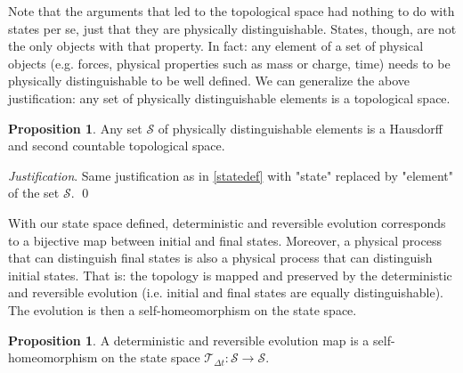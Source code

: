 \documentclass[aps,pra,10pt,twocolumn,floatfix,nofootinbib]{revtex4-1}
\numberwithin{equation}{section}
\theoremstyle{definition}
\newtheorem{prop}[equation]{Proposition}
\newenvironment{justification}{\emph{Justification}.}{\qed}
\begin{document}
Note that the arguments that led to the topological space had nothing to do with states per se, just that they are physically distinguishable. States, though, are not the only objects with that property. In fact: any element of a set of physical objects (e.g. forces, physical properties such as mass or charge, time) needs to be physically distinguishable to be well defined. We can generalize the above justification: any set of physically distinguishable elements is a topological space.

\begin{prop}\label{topologically_distinguishable}
	Any set $\mathcal{S}$ of physically distinguishable elements is a Hausdorff and second countable topological space.
\end{prop}

\begin{justification}
	Same justification as in \ref{statedef} with "state" replaced by "element" of the set $\mathcal{S}$.
\end{justification}

With our state space defined, deterministic and reversible evolution corresponds to a bijective map between initial and final states. Moreover, a physical process that can distinguish final states is also a physical process that can distinguish initial states. That is: the topology is mapped and preserved by the deterministic and reversible evolution (i.e. initial and final states are equally distinguishable). The evolution is then a self-homeomorphism on the state space.

\begin{prop}\label{detrevmap}
A deterministic and reversible evolution map is a self-homeomorphism on the state space $\mathcal{T}_{\Delta t}:\mathcal{S} \rightarrow \mathcal{S}$.
\end{prop}
\end{document}
